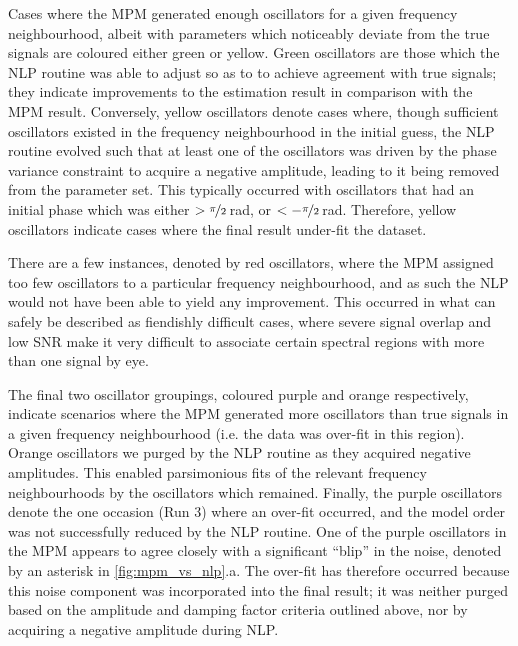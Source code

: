 Cases where the
\ac{MPM} generated enough oscillators for a given frequency neighbourhood,
albeit with parameters which noticeably deviate from the true signals are
coloured either green or yellow. Green oscillators are those which the \ac{NLP} routine
was able to adjust so as to to achieve agreement with true signals;
they indicate improvements to the estimation result in comparison with the \ac{MPM}
result. Conversely, yellow oscillators denote cases where, though
sufficient oscillators existed in the frequency neighbourhood in the initial
guess, the \ac{NLP} routine evolved such that at least one of the oscillators
was driven by the phase variance constraint to acquire a negative amplitude,
leading to it being removed from the parameter set. This typically occurred with
oscillators that had an initial phase which was either $>
\nicefrac{\pi}{2}$\,\unit{\radian}, or $< -\nicefrac{\pi}{2}$\,\unit{\radian}.
Therefore, yellow oscillators indicate cases where the final result
under-fit the dataset.

There are a few instances, denoted by red oscillators,
where the \ac{MPM} assigned too few oscillators to a particular frequency
neighbourhood, and as such the \ac{NLP} would not have been able to yield any
improvement. This occurred in what can safely be described as
fiendishly difficult cases, where severe signal overlap and low \ac{SNR} make
it very difficult to associate certain spectral regions with more than one
signal by eye.

The final two oscillator groupings, coloured purple and orange respectively,
indicate scenarios where the \ac{MPM} generated more oscillators than true
signals in a given frequency neighbourhood (i.e. the data was over-fit in this region). Orange
oscillators we purged by the \ac{NLP} routine as they acquired negative
amplitudes. This enabled parsimonious fits of the relevant frequency neighbourhoods by
the oscillators which remained. Finally, the purple oscillators denote the one
occasion (Run 3) where an over-fit occurred, and the model order was not
successfully reduced by the \ac{NLP} routine. One of the purple oscillators in
the \ac{MPM} appears to agree closely with a significant ``blip'' in the noise,
denoted by an asterisk in \cref{fig:mpm_vs_nlp}.a.
The over-fit has therefore occurred because this noise component was
incorporated into the final result; it was neither purged based on the
amplitude and damping factor criteria outlined above, nor by acquiring a
negative amplitude during \ac{NLP}.

